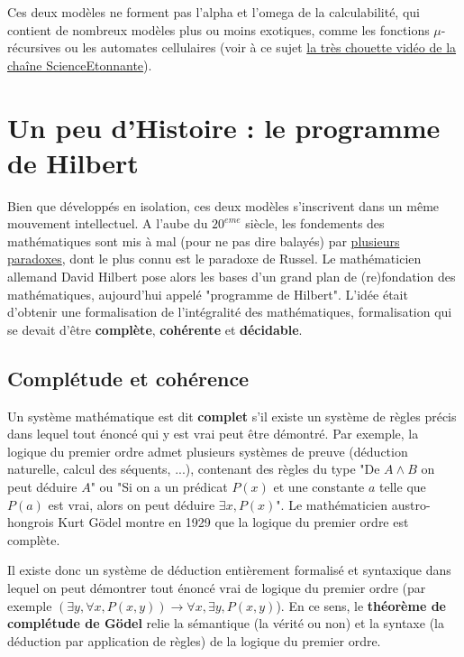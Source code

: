 Ces deux modèles ne forment pas l'alpha et l'omega de la calculabilité, qui contient de nombreux modèles plus ou moins exotiques, comme les fonctions $\mu$-récursives ou les automates cellulaires (voir à ce sujet \href{https://www.youtube.com/watch?v=S-W0NX97DB0}{la très chouette vidéo de la chaîne ScienceEtonnante}).

\section{Un peu d'Histoire : le programme de Hilbert} 

Bien que développés en isolation, ces deux modèles s'inscrivent dans un même mouvement intellectuel. A l'aube du $20^{eme}$ siècle, les fondements des mathématiques sont mis à mal (pour ne pas dire balayés) par \href{https://en.wikipedia.org/wiki/Foundations_of_mathematics#Foundational_crisis}{plusieurs paradoxes}, dont le plus connu est le paradoxe de Russel. Le mathématicien allemand David Hilbert pose alors les bases d'un grand plan de (re)fondation des mathématiques, aujourd'hui appelé "programme de Hilbert". L'idée était d'obtenir une formalisation de l'intégralité des mathématiques, formalisation qui se devait d'être \textbf{complète}, \textbf{cohérente} et \textbf{décidable}.

\subsection{Complétude et cohérence}
Un système mathématique est dit \textbf{complet} s'il existe un système de règles précis dans lequel tout énoncé qui y est vrai peut être démontré. Par exemple, la logique du premier ordre admet plusieurs systèmes de preuve (déduction naturelle, calcul des séquents, ...), contenant des règles du type "De $A \wedge B$ on peut déduire $A$" ou "Si on a un prédicat $P(x)$ et une constante $a$ telle que $P(a)$ est vrai, alors on peut déduire $\exists x, P(x)$". Le mathématicien austro-hongrois Kurt Gödel montre en 1929 que la logique du premier ordre est complète. 

Il existe donc un système de déduction entièrement formalisé et syntaxique dans lequel on peut démontrer tout énoncé vrai de logique du premier ordre (par exemple $(\exists y, \forall x, P(x,y)) \rightarrow \forall x, \exists y, P(x,y)$). En ce sens, le \textbf{théorème de complétude de Gödel} relie la sémantique (la vérité ou non) et la syntaxe (la déduction par application de règles) de la logique du premier ordre.

